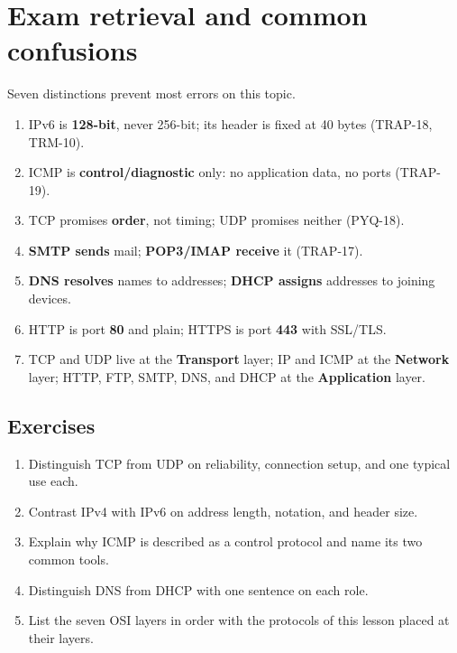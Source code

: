 \section{Exam retrieval and common confusions}
Seven distinctions prevent most errors on this topic.
\begin{enumerate}
  \item IPv6 is \textbf{128-bit}, never 256-bit; its header is fixed at 40
    bytes (TRAP-18, TRM-10).
  \item ICMP is \textbf{control/diagnostic} only: no application data, no
    ports (TRAP-19).
  \item TCP promises \textbf{order}, not timing; UDP promises neither
    (PYQ-18).
  \item \textbf{SMTP sends} mail; \textbf{POP3/IMAP receive} it (TRAP-17).
  \item \textbf{DNS resolves} names to addresses; \textbf{DHCP assigns}
    addresses to joining devices.
  \item HTTP is port \textbf{80} and plain; HTTPS is port \textbf{443} with
    SSL/TLS.
  \item TCP and UDP live at the \textbf{Transport} layer; IP and ICMP at the
    \textbf{Network} layer; HTTP, FTP, SMTP, DNS, and DHCP at the
    \textbf{Application} layer.
\end{enumerate}

\subsection*{Exercises}
\begin{enumerate}[label=\arabic*.]
  \item Distinguish TCP from UDP on reliability, connection setup, and one
    typical use each.
  \item Contrast IPv4 with IPv6 on address length, notation, and header size.
  \item Explain why ICMP is described as a control protocol and name its two
    common tools.
  \item Distinguish DNS from DHCP with one sentence on each role.
  \item List the seven OSI layers in order with the protocols of this lesson
    placed at their layers.
\end{enumerate}

